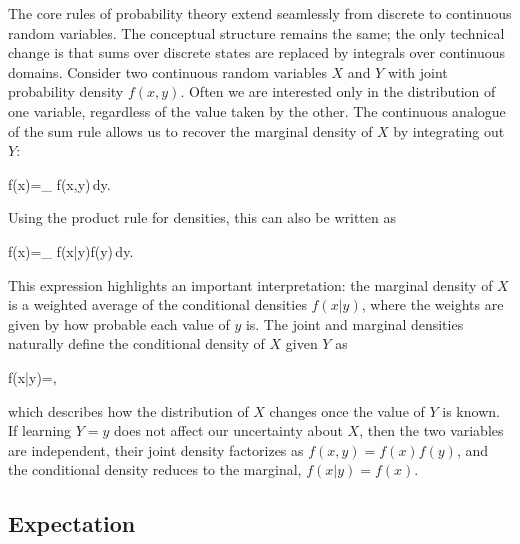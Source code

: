 The core rules of probability theory extend seamlessly from discrete to continuous random variables. The conceptual structure remains the same; the only technical change is that sums over discrete states are replaced by integrals over continuous domains. Consider two continuous random variables $X$ and $Y$ with joint probability density $f(x,y)$. Often we are interested only in the distribution of one variable, regardless of the value taken by the other. The continuous analogue of the sum rule allows us to recover the marginal density of $X$ by integrating out $Y$:
\begin{myequation}
f(x)=\int_{} f(x,y)\,dy.
\end{myequation}
Using the product rule for densities, this can also be written as
\begin{myequation}
f(x)=\int_{} f(x|y)f(y)\,dy.
\end{myequation}
This expression highlights an important interpretation: the marginal density of $X$ is a weighted average of the conditional densities $f(x|y)$, where the weights are given by how probable each value of $y$ is. The joint and marginal densities naturally define the \alert{conditional density} of $X$ given $Y$ as
\begin{myequation}
f(x|y)=,
\end{myequation}
which describes how the distribution of $X$ changes once the value of $Y$ is known. If learning $Y=y$ does not affect our uncertainty about $X$, then the two variables are \alert{independent}, their joint density factorizes as $f(x,y)=f(x)f(y)$, and the conditional density reduces to the marginal, $f(x|y)=f(x)$.

\subsection*{Expectation}

